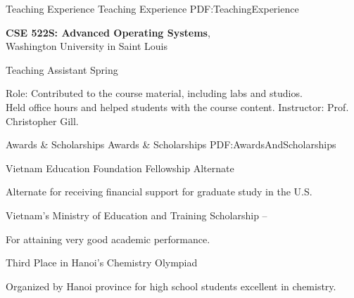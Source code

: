 \documentclass[letterpaper,MMMyyyy,nonstopmode]{simpleresumecv}
\begin{document}
\begin{Body}
\endgroup

\Section
{Teaching \newline Experience}
{Teaching \newline Experience}
{PDF:TeachingExperience}

\Entry
{\textbf{CSE 522S: Advanced Operating Systems}}, \\
Washington University in Saint Louis

\BulletItem Teaching Assistant \hfill Spring~
\begin{Detail}
\SubBulletItem Role: Contributed to the course material, including labs and studios. \\
Held office hours and helped students with the course content. 
\SubBulletItem Instructor: Prof. Christopher Gill.
\end{Detail}

\newpage

\Section
{Awards \&\newline
Scholarships}
{Awards \& Scholarships}
{PDF:AwardsAndScholarships}

\BulletItem
Vietnam Education Foundation Fellowship Alternate
\hfill
{}
\begin{Detail}
\Item
Alternate for receiving financial support for graduate study in the U.S.
\end{Detail}

\Gap
\BulletItem
Vietnam's Ministry of Education and Training Scholarship 
\hfill
{} -- 
\begin{Detail}
\Item
For attaining very good academic performance. 
\end{Detail}

\Gap
\BulletItem
Third Place in Hanoi's Chemistry Olympiad
\hfill
{}
\begin{Detail}
\Item
Organized by Hanoi province for high school students excellent in chemistry.
\end{Detail}



\end{Body}
\end{document}
